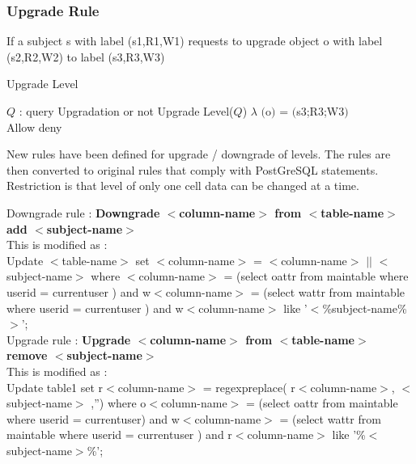 \documentclass[11pt,a4paper]{report}
\begin{document}
\subsubsection{Upgrade Rule} 

If a subject s with label (s1,R1,W1) requests to upgrade object o with label (s2,R2,W2) to label (s3,R3,W3)

\begin{algorithm}[H]
\caption{Upgrade Level}
\renewcommand{\algorithmicrequire}{\textbf{Inputs:}}
\begin{algorithmic}[1]
\REQUIRE $Q$ : query 
\ENSURE Upgradation or not
\STATE Upgrade Level($Q$)
   \STATE $\lambda$ $($o$)$ = $($s3;R3;W3$)$ \\
    \STATE Allow
    \ELSE
   \STATE deny
  \ENDIF
 
\end{algorithmic}
\end{algorithm}



New rules have been defined for upgrade / downgrade of levels. The rules are then converted to original rules that comply with PostGreSQL statements. Restriction is that level of only one cell data can be changed at a time. 

Downgrade rule : \textbf{Downgrade $<$column-name$>$ from $<$table-name$>$ add $<$subject-name$>$}\\

This is modified as : \\
Update $<$table-name$>$ set $<$column-name$>$ = $<$column-name$>$ $||$ $<$subject-name$>$  where $<$column-name$>$ = (select o\textunderscore attr from main\textunderscore table where user\textunderscore id = current\textunderscore user ) and w\textunderscore$<$column-name$>$ = (select w\textunderscore attr from main\textunderscore table where user\textunderscore id = current\textunderscore user ) and w\textunderscore$<$column-name$>$ like '$<$\%subject-name\%$>$'; \\[2em]

Upgrade rule : \textbf{Upgrade $<$column-name$>$ from $<$table-name$>$ remove $<$subject-name$>$ }  \\
This is modified as : \\
Update table1 set r\textunderscore $<$column-name$>$ = regexp\textunderscore replace( r\textunderscore$<$column-name$>$,  $<$subject-name$>$ ,'') where o\textunderscore $<$column-name$>$ = (select o\textunderscore attr from main\textunderscore table where user\textunderscore id = current\textunderscore user) and w\textunderscore $<$column-name$>$ = (select w\textunderscore attr from main\textunderscore table where user\textunderscore id = current\textunderscore user  ) and r\textunderscore $<$column-name$>$ like '\%$<$subject-name$>$\%'; 
\end{document}

